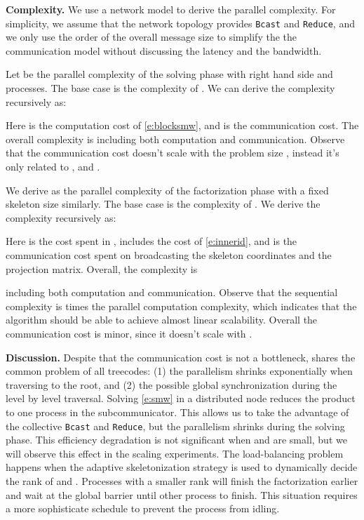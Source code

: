 {\bf Complexity.}
We use a network model to derive the parallel complexity.
For simplicity, we assume that the network topology provides 
 \texttt{Bcast} and \texttt{Reduce}, and
we only use the order of the 
overall message size to simplify the the communication model
without discussing the latency and the bandwidth.

Let  be the parallel complexity of the solving phase 
with  right hand side and  processes. The base case 
 is the complexity of .
We can derive the complexity recursively as:

Here  is the computation cost of \eqref{e:blocksmw}, and
 is the communication cost.
The overall complexity is 
 including
both computation and communication.
Observe that the communication cost doesn't scale with the problem size
, instead it's only related to ,  and .


We derive  as the 
parallel complexity of the factorization phase with a fixed
skeleton size  similarly. The base case 
 is the complexity of .
We derive the complexity recursively as:

Here  is the cost spent in , 
 includes the cost of \eqref{e:innerid}, and
 is the communication cost spent on broadcasting the
skeleton coordinates and the projection matrix.
Overall, the complexity is 
 
including both computation and communication.
Observe that the sequential complexity is  times the parallel
computation complexity, which indicates that the algorithm should
be able to achieve almost linear scalability. 
Overall the communication cost is minor, since it doesn't scale with .












{\bf Discussion.}
Despite that the communication cost is not a bottleneck, \IASKIT{}
shares the common problem of all treecodes: (1) the parallelism shrinks
exponentially when traversing to the root, and (2) the possible global 
synchronization during the level by level traversal. 
Solving \eqref{e:smw} in a distributed node reduces the  product
to one process in the subcommunicator. This allows us to take the 
advantage of the collective \texttt{Bcast} and \texttt{Reduce}, but
the parallelism shrinks during the solving phase.
This efficiency degradation is not significant when  and  are
small, but we will observe this effect in the scaling experiments.
The load-balancing problem happens when the adaptive skeletonization
strategy is used to dynamically decide the rank of  and .
Processes with a smaller rank will finish the factorization earlier
and wait at the global barrier until other process to finish.
This situation requires a more sophisticate schedule to prevent
the process from idling.














